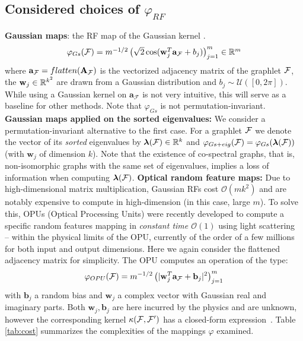 \documentclass{article}
\begin{document}
\subsection{Considered choices of $\varphi_{RF}$}
\label{sec:phi_choices}
\textbf{Gaussian maps}: the RF map of the Gaussian kernel \cite{rahimi2008random}. 
\begin{equation}
\label{eq:Gaussian_map}
 \mathsmaller{\varphi_{Gs}(\F) = m^{-1/2} \left( \sqrt{2} \cos(\mathbf{w}_j^T\mathbf{a}_\F+b_j) \right)_{j=1}^m \in \mathbb{R}^m}
\end{equation}
where $\mathbf{a}_{\mathcal{F}}=flatten(\mathbf{A}_{\mathcal{F}})$ is the vectorized adjacency matrix of the graphlet $\mathcal{F}$, 
the $\mathbf{w}_j\in \mathbb{R}^{k^2}$ are drawn from a Gaussian distribution and $b_j \sim \mathcal{U}([0, 2\pi])$. While using a Gaussian kernel on $\mathbf{a}_\mathcal{F}$ is not very intuitive, this will serve as a baseline for other methods. Note that $\varphi_{Gs}$ is not permutation-invariant.
\BlankLine
\noindent\textbf{Gaussian maps applied on the sorted eigenvalues:} We consider a permutation-invariant alternative to the first case. %
For a graphlet $\mathcal{F}$ we denote the vector of its \emph{sorted} eigenvalues by $\bm{\lambda}(\mathcal{F}) \in\mathbb{R}^k$ and $\varphi_{Gs+eig}(\mathcal{F}) = \varphi_{Gs}(\bm{\lambda}(\mathcal{F}))$ (with $\mathbf{w}_j$ of dimension $k$). Note that the existence of co-spectral graphs, that is, non-isomorphic graphs with the same set of eigenvalues, implies a loss of information when computing $\bm{\lambda}(\mathcal{F})$.
\BlankLine
\noindent\textbf{Optical random feature maps:} Due to high-dimensional matrix multiplication, Gaussian RFs cost $\mathcal{O}(mk^2)$ and are notably expensive to compute in high-dimension (in this case, large $m$). To solve this, OPUs (Optical Processing Units) were recently developed to compute a specific random features mapping in \emph{constant time  $\mathcal{O}(1)$} using light scattering~\cite{saade_opu} -- within the physical limits of the OPU, currently of the order of a few millions for both input and output dimensions. Here we again consider the flattened adjacency matrix for simplicity. The OPU computes an operation of the type:
\[
\label{OPU_equation}
\mathbf{\varphi}_{OPU}(\mathcal{F})= m^{-1/2}\left(|\mathbf{w}_j^T \mathbf{a}_{\mathcal{F}}+\mathbf{b}_j|^2\right)_{j=1}^m
\]
with $\mathbf{b}_j$ a random bias and $\mathbf{w}_j$ a complex vector with Gaussian real and imaginary parts. Both $\mathbf{w}_j, \mathbf{b}_j$ are here incurred by the physics and are unknown, however the corresponding kernel $\kappa(\mathcal{F},\mathcal{F}')$ has a closed-form expression~\cite{saade_opu}.
%
Table \ref{tab:cost} summarizes the complexities of the mappings $\varphi$ examined.
\end{document}
